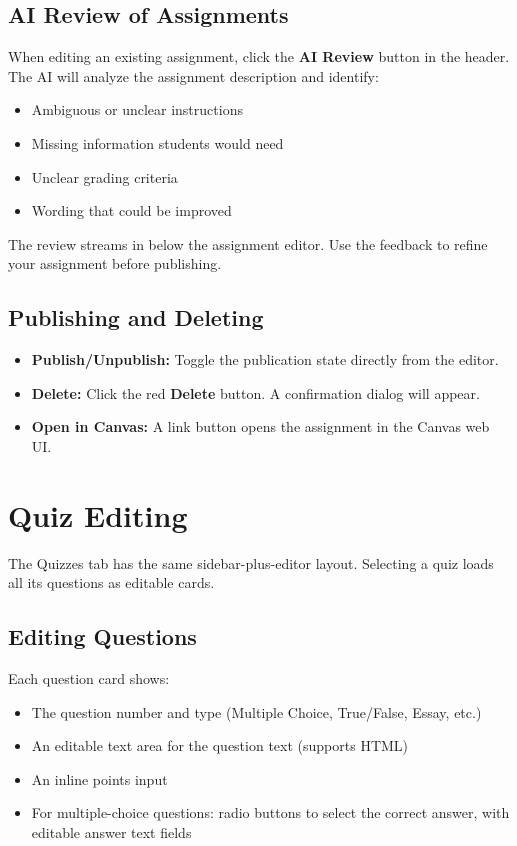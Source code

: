 \documentclass[12pt,letterpaper]{article}
\begin{document}
\subsection{AI Review of Assignments}

When editing an existing assignment, click the \textbf{AI Review} button in the header. The AI will analyze the assignment description and identify:
\begin{itemize}[leftmargin=*]
    \item Ambiguous or unclear instructions
    \item Missing information students would need
    \item Unclear grading criteria
    \item Wording that could be improved
\end{itemize}

The review streams in below the assignment editor. Use the feedback to refine your assignment before publishing.

\subsection{Publishing and Deleting}

\begin{itemize}[leftmargin=*]
    \item \textbf{Publish/Unpublish:} Toggle the publication state directly from the editor.
    \item \textbf{Delete:} Click the red \textbf{Delete} button. A confirmation dialog will appear.
    \item \textbf{Open in Canvas:} A link button opens the assignment in the Canvas web UI.
\end{itemize}


\section{Quiz Editing}

The Quizzes tab has the same sidebar-plus-editor layout. Selecting a quiz loads all its questions as editable cards.

\subsection{Editing Questions}

Each question card shows:
\begin{itemize}[leftmargin=*]
    \item The question number and type (Multiple Choice, True/False, Essay, etc.)
    \item An editable text area for the question text (supports HTML)
    \item An inline points input
    \item For multiple-choice questions: radio buttons to select the correct answer, with editable answer text fields
\end{itemize}
\end{document}

